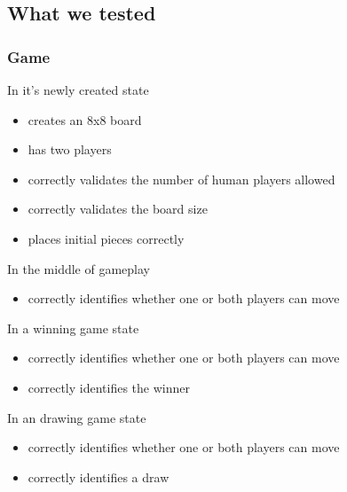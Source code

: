 \documentclass[a4wide, 11pt]{article}
\begin{document}
  \subsection{What we tested}

  \subsubsection{Game}
  \begin{itemize}
    \setlength{\itemsep}{-1mm}
    \begin{item}
      In it's newly created state
      \vspace{-3mm}
      \begin{itemize}
        \setlength{\itemsep}{-1mm}
        \item{creates an 8x8 board}
        \item{has two players}
        \item{correctly validates the number of human players allowed}
        \item{correctly validates the board size}
        \item{places initial pieces correctly}
      \end{itemize}
    \end{item}
    \begin{item}
      \vspace{-2mm}
      In the middle of gameplay
      \vspace{-3mm}
      \begin{itemize}
        \setlength{\itemsep}{-1mm}
        \item{correctly identifies whether one or both players can move}
      \end{itemize}
    \end{item}
    \begin{item}
      \vspace{-2mm}
      In a winning game state
      \vspace{-3mm}
      \begin{itemize}
        \setlength{\itemsep}{-1mm}
        \item{correctly identifies whether one or both players can move}
        \item{correctly identifies the winner}
      \end{itemize}
    \end{item}
    \begin{item}
      \vspace{-2mm}
      In an drawing game state
      \vspace{-3mm}
      \begin{itemize}
        \setlength{\itemsep}{-1mm}
        \item{correctly identifies whether one or both players can move}
        \item{correctly identifies a draw}
      \end{itemize}
    \end{item}
  \end{itemize}
\end{document}
